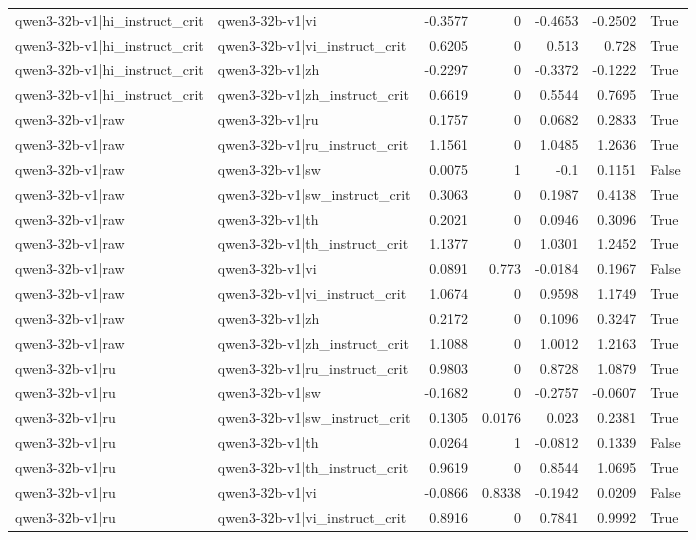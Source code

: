 \begin{table}
\begin{tabular}{l l r r r r l}
qwen3-32b-v1|hi_instruct_crit & qwen3-32b-v1|vi & -0.3577 & 0 & -0.4653 & -0.2502 & True \\
qwen3-32b-v1|hi_instruct_crit & qwen3-32b-v1|vi_instruct_crit & 0.6205 & 0 & 0.513 & 0.728 & True \\
qwen3-32b-v1|hi_instruct_crit & qwen3-32b-v1|zh & -0.2297 & 0 & -0.3372 & -0.1222 & True \\
qwen3-32b-v1|hi_instruct_crit & qwen3-32b-v1|zh_instruct_crit & 0.6619 & 0 & 0.5544 & 0.7695 & True \\
qwen3-32b-v1|raw & qwen3-32b-v1|ru & 0.1757 & 0 & 0.0682 & 0.2833 & True \\
qwen3-32b-v1|raw & qwen3-32b-v1|ru_instruct_crit & 1.1561 & 0 & 1.0485 & 1.2636 & True \\
qwen3-32b-v1|raw & qwen3-32b-v1|sw & 0.0075 & 1 & -0.1 & 0.1151 & False \\
qwen3-32b-v1|raw & qwen3-32b-v1|sw_instruct_crit & 0.3063 & 0 & 0.1987 & 0.4138 & True \\
qwen3-32b-v1|raw & qwen3-32b-v1|th & 0.2021 & 0 & 0.0946 & 0.3096 & True \\
qwen3-32b-v1|raw & qwen3-32b-v1|th_instruct_crit & 1.1377 & 0 & 1.0301 & 1.2452 & True \\
qwen3-32b-v1|raw & qwen3-32b-v1|vi & 0.0891 & 0.773 & -0.0184 & 0.1967 & False \\
qwen3-32b-v1|raw & qwen3-32b-v1|vi_instruct_crit & 1.0674 & 0 & 0.9598 & 1.1749 & True \\
qwen3-32b-v1|raw & qwen3-32b-v1|zh & 0.2172 & 0 & 0.1096 & 0.3247 & True \\
qwen3-32b-v1|raw & qwen3-32b-v1|zh_instruct_crit & 1.1088 & 0 & 1.0012 & 1.2163 & True \\
qwen3-32b-v1|ru & qwen3-32b-v1|ru_instruct_crit & 0.9803 & 0 & 0.8728 & 1.0879 & True \\
qwen3-32b-v1|ru & qwen3-32b-v1|sw & -0.1682 & 0 & -0.2757 & -0.0607 & True \\
qwen3-32b-v1|ru & qwen3-32b-v1|sw_instruct_crit & 0.1305 & 0.0176 & 0.023 & 0.2381 & True \\
qwen3-32b-v1|ru & qwen3-32b-v1|th & 0.0264 & 1 & -0.0812 & 0.1339 & False \\
qwen3-32b-v1|ru & qwen3-32b-v1|th_instruct_crit & 0.9619 & 0 & 0.8544 & 1.0695 & True \\
qwen3-32b-v1|ru & qwen3-32b-v1|vi & -0.0866 & 0.8338 & -0.1942 & 0.0209 & False \\
qwen3-32b-v1|ru & qwen3-32b-v1|vi_instruct_crit & 0.8916 & 0 & 0.7841 & 0.9992 & True \\

\end{tabular}
\end{table}
